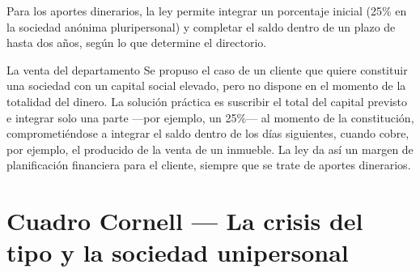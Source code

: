 \documentclass[12pt,oneside]{book}
\begin{document}
Para los aportes dinerarios, la ley permite integrar un porcentaje inicial (25\% en la sociedad anónima pluripersonal) y completar el saldo dentro de un plazo de hasta dos años, según lo que determine el directorio.

\begin{example}{La venta del departamento}
Se propuso el caso de un cliente que quiere constituir una sociedad con un capital social elevado, pero no dispone en el momento de la totalidad del dinero. La solución práctica es suscribir el total del capital previsto e integrar solo una parte —por ejemplo, un 25\%— al momento de la constitución, comprometiéndose a integrar el saldo dentro de los días siguientes, cuando cobre, por ejemplo, el producido de la venta de un inmueble. La ley da así un margen de planificación financiera para el cliente, siempre que se trate de aportes dinerarios.
\end{example}

\section*{Cuadro Cornell — La crisis del tipo y la sociedad unipersonal}
\end{document}
